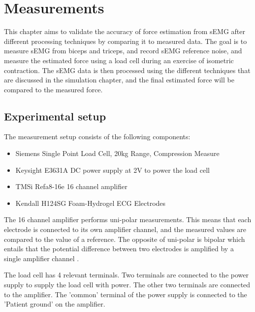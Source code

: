 \chapter{Measurements}\label{sec:measurements}
This chapter aims to validate the accuracy of force estimation from sEMG after different processing techniques by comparing it to measured data. The goal is to measure sEMG from biceps and triceps, and record sEMG reference noise, and measure the estimated force using a load cell during an exercise of isometric contraction. The sEMG data is then processed using the different techniques that are discussed in the simulation chapter, and the final estimated force will be compared to the measured force. 

\section{Experimental setup}
The measurement setup consists of the following components:
\begin{itemize}
    \item Siemens Single Point Load Cell, 20kg Range, Compression Measure
    \item Keysight E3631A DC power supply at 2V to power the load cell
    \item TMSi Refa8-16e 16 channel amplifier
    \item Kendall H124SG Foam-Hydrogel ECG Electrodes 
\end{itemize}

The 16 channel amplifier performs uni-polar measurements. This means that each electrode is connected to its own amplifier channel, and the measured values are compared to the value of a reference. The opposite of uni-polar is bipolar which entails that the potential difference between two electrodes is amplified by a single amplifier channel \cite{tmsi_unipolar_bipolar}. 

The load cell has 4 relevant terminals. Two terminals are connected to the power supply to supply the load cell with power. The other two terminals are connected to the amplifier. The 'common' terminal of the power supply is connected to the 'Patient ground' on the amplifier.

